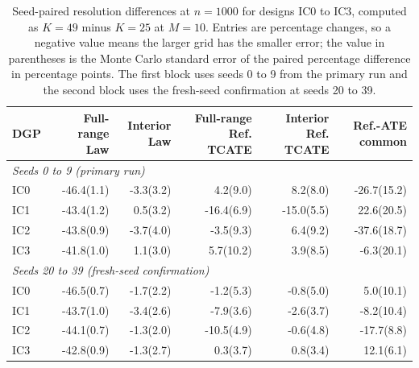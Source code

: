 \begin{table}[t]
\centering
\scriptsize
\setlength{\tabcolsep}{3pt}
\caption{Seed-paired resolution differences at $n=1000$ for designs IC0 to IC3, computed as $K=49$ minus $K=25$ at $M=10$. Entries are percentage changes, so a negative value means the larger grid has the smaller error; the value in parentheses is the Monte Carlo standard error of the paired percentage difference in percentage points. The first block uses seeds 0 to 9 from the primary run and the second block uses the fresh-seed confirmation at seeds 20 to 39.}
\label{tab:sensitivity-resolution}
\begin{tabular}{lrrrrr}
\toprule
DGP & Full-range Law & Interior Law & Full-range Ref. TCATE & Interior Ref. TCATE & Ref.-ATE common \\
\midrule
\multicolumn{6}{l}{\textit{Seeds 0 to 9 (primary run)}} \\
\midrule
IC0 & -46.4(1.1) & -3.3(3.2) & 4.2(9.0) & 8.2(8.0) & -26.7(15.2) \\
IC1 & -43.4(1.2) & 0.5(3.2) & -16.4(6.9) & -15.0(5.5) & 22.6(20.5) \\
IC2 & -43.8(0.9) & -3.7(4.0) & -3.5(9.3) & 6.4(9.2) & -37.6(18.7) \\
IC3 & -41.8(1.0) & 1.1(3.0) & 5.7(10.2) & 3.9(8.5) & -6.3(20.1) \\
\multicolumn{6}{l}{\textit{Seeds 20 to 39 (fresh-seed confirmation)}} \\
\midrule
IC0 & -46.5(0.7) & -1.7(2.2) & -1.2(5.3) & -0.8(5.0) & 5.0(10.1) \\
IC1 & -43.7(1.0) & -3.4(2.6) & -7.9(3.6) & -2.6(3.7) & -8.2(10.4) \\
IC2 & -44.1(0.7) & -1.3(2.0) & -10.5(4.9) & -0.6(4.8) & -17.7(8.8) \\
IC3 & -42.8(0.9) & -1.3(2.7) & 0.3(3.7) & 0.8(3.4) & 12.1(6.1) \\
\bottomrule
\end{tabular}
\end{table}
